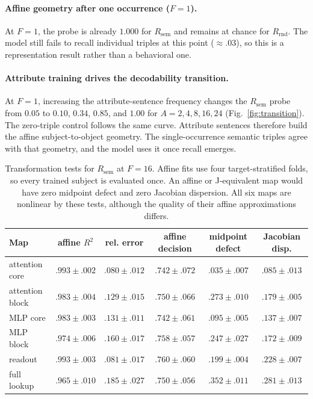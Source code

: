 \documentclass[11pt]{article}
\newcommand{\Rsem}{R_{\mathrm{sem}}}
\newcommand{\Rrnd}{R_{\mathrm{rnd}}}
\begin{document}
\paragraph{Affine geometry after one occurrence ($F{=}1$).}
At $F{=}1$, the probe is already $1.000$ for $\Rsem$ and remains at chance for
$\Rrnd$.  The model still fails to recall individual triples at this point
($\approx .03$), so this is a representation result rather than a behavioral one.

\paragraph{Attribute training drives the decodability transition.}
At $F{=}1$, increasing the attribute-sentence frequency changes the $\Rsem$ probe
from $0.05$ to $0.10$, $0.34$, $0.85$, and $1.00$ for
$A=2,4,8,16,24$ (Fig.~\ref{fig:transition}).  The zero-triple control follows the
same curve.  Attribute sentences therefore build the affine subject-to-object
geometry.  The single-occurrence semantic triples agree with that geometry, and
the model uses it once recall emerges.

\begin{table}[ht]
\centering
\small
\begin{tabular}{lccccc}
\toprule
Map & affine $R^2$ & rel. error & affine decision & midpoint defect & Jacobian disp.\\
\midrule
attention core & $.993\pm.002$ & $.080\pm.012$ & $.742\pm.072$ & $.035\pm.007$ & $.085\pm.013$\\
attention block & $.983\pm.004$ & $.129\pm.015$ & $.750\pm.066$ & $.273\pm.010$ & $.179\pm.005$\\
MLP core & $.983\pm.003$ & $.131\pm.011$ & $.742\pm.061$ & $.095\pm.005$ & $.137\pm.007$\\
MLP block & $.974\pm.006$ & $.160\pm.017$ & $.758\pm.057$ & $.247\pm.027$ & $.172\pm.009$\\
readout & $.993\pm.003$ & $.081\pm.017$ & $.760\pm.060$ & $.199\pm.004$ & $.228\pm.007$\\
full lookup & $.965\pm.010$ & $.185\pm.027$ & $.750\pm.056$ & $.352\pm.011$ & $.281\pm.013$\\
\bottomrule
\end{tabular}
\caption{Transformation tests for $\Rsem$ at $F{=}16$.  Affine fits use four
target-stratified folds, so every trained subject is evaluated once.  An affine or
J-equivalent map would have zero midpoint defect and zero Jacobian dispersion.  All
six maps are nonlinear by these tests, although the quality of their affine
approximations differs.}
\label{tab:goal1-transformation}
\end{table}
\end{document}
